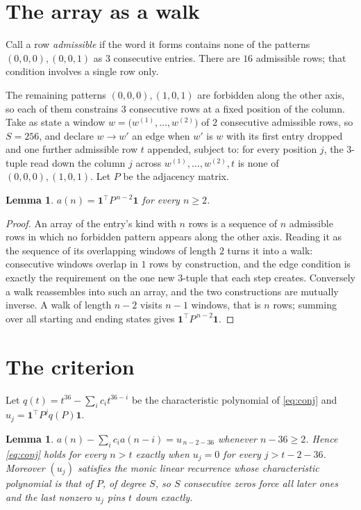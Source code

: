 \documentclass[11pt,a4paper]{article}
\theoremstyle{plain}
\newtheorem{lemma}[theorem]{Lemma}
\theoremstyle{definition}
\begin{document}
\section{The array as a walk}

Call a row \emph{admissible} if the word it forms contains none of the patterns
$(0,0,0), (0,0,1)$ as $3$ consecutive entries. There are $16$ admissible rows; that condition
involves a single row only.

The remaining patterns $(0,0,0), (1,0,1)$ are forbidden along the other axis, so each of them
constrains $3$ consecutive rows at a fixed position of the column. Take as state a
window $w=\bigl(w^{(1)},\dots,w^{(2)}\bigr)$ of $2$ consecutive admissible
rows, so $S=256$, and declare $w\to w'$ an edge when $w'$ is $w$ with its first entry
dropped and one further admissible row $t$ appended, subject to: for every position
$j$, the $3$-tuple read down the column $j$ across $w^{(1)},\dots,w^{(2)},t$
is none of $(0,0,0), (1,0,1)$. Let $P$ be the adjacency matrix.

\begin{lemma}\label{lem:walk}
$a(n)=\mathbf{1}^{\!\top}P^{\,n-2}\mathbf{1}$ for every $n\ge2$.
\end{lemma}

\begin{proof}
An array of the entry's kind with $n$ rows is a sequence of $n$ admissible rows in
which no forbidden pattern appears along the other axis. Reading it as the sequence of its
overlapping windows of length $2$ turns it into a walk: consecutive windows overlap in
$1$ rows by construction, and the edge condition is exactly the requirement on the one
new $3$-tuple that each step creates. Conversely a walk reassembles into such an array,
and the two constructions are mutually inverse. A walk of length $n-2$ visits $n-1$
windows, that is $n$ rows; summing over all starting and ending states gives
$\mathbf{1}^{\!\top}P^{\,n-2}\mathbf{1}$.
\end{proof}

\section{The criterion}

Let $q(t)=t^{36}-\sum_i c_i t^{36-i}$ be the characteristic polynomial of
\eqref{eq:conj} and $u_j=\mathbf{1}^{\!\top}P^{j}q(P)\mathbf{1}$.

\begin{lemma}\label{lem:crit}
$a(n)-\sum_i c_i a(n-i)=u_{\,n-2-36}$ whenever $n-36\ge2$. Hence
\eqref{eq:conj} holds for every $n>t$ exactly when $u_j=0$ for every
$j>t-2-36$. Moreover $(u_j)$ satisfies the monic linear recurrence whose
characteristic polynomial is that of $P$, of degree $S$, so $S$ consecutive zeros force all
later ones and the last nonzero $u_j$ pins $t$ down exactly.
\end{lemma}
\end{document}
